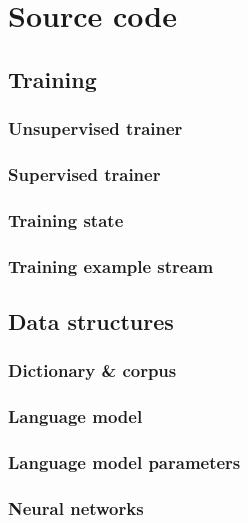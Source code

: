 \chapter{Source code}

\section{Training}
\subsection{Unsupervised trainer}
\label{sec:unsuptrainer}

\subsection{Supervised trainer}
\label{sec:suptrainer}
\subsection{Training state}
\label{sec:trainstate}

\subsection{Training example stream}
\label{sec:trainexamplestream}

\section{Data structures}
\subsection{Dictionary \& corpus}
\label{sec:dict}

\subsection{Language model}
\label{sec:langmodel}

\subsection{Language model parameters}
\label{sec:nnetworkparams}

\subsection{Neural networks}
\label{sec:nnetwork}

